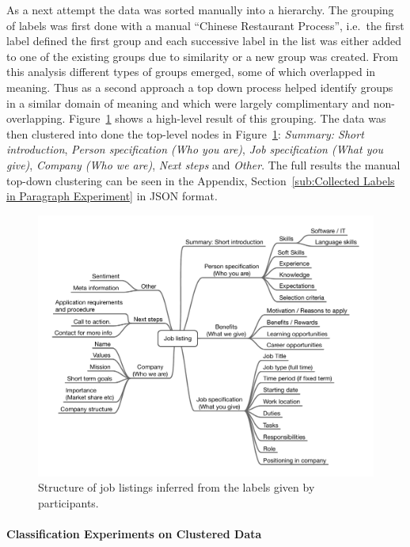 As a next attempt the data was sorted manually into a hierarchy. The grouping of labels was first done with a manual ``Chinese Restaurant Process'', i.e.\ the first label defined the first group and each successive label in the list was either added to one of the existing groups due to similarity or a new group was created.
From this analysis different types of groups emerged, some of which overlapped in meaning. Thus as a second approach a top down process helped identify groups in a similar domain of meaning and which were largely complimentary and non-overlapping.
Figure~\ref{fig:job-listing-structure} shows a high-level result of this grouping. The data was then clustered into done the top-level nodes in Figure~\ref{fig:job-listing-structure}: \emph{Summary: Short introduction}, \emph{Person specification (Who you are)}, \emph{Job specification (What you give)}, \emph{Company (Who we are)}, \emph{Next steps} and \emph{Other}. The full results the manual top-down clustering can be seen in the Appendix, Section~\ref{sub:Collected Labels in Paragraph Experiment} in \acrshort{JSON} format.

\begin{figure}[h]
  \centering
  \includegraphics[width=\textwidth]{img/job-listing-structure.pdf}
  \caption{Structure of job listings inferred from the labels given by participants.}
\label{fig:job-listing-structure}
\end{figure}

\paragraph{Classification Experiments on Clustered Data}
\label{par:Classification Experiments on Clustered Data (Multi-label Paragraph Classification)}

